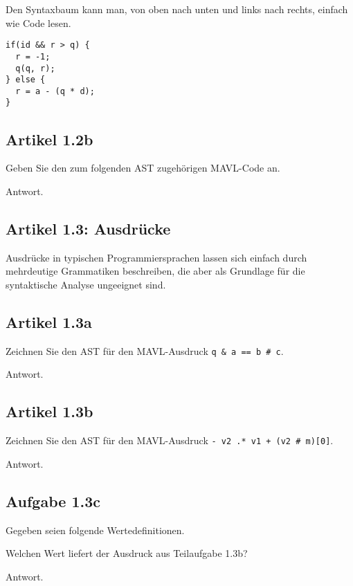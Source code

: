 \documentclass[
  ngerman,
  DIV=14
]{scrartcl}
\begin{document}
\bigskip\noindent
Den Syntaxbaum kann man, von oben nach unten und links nach rechts, einfach wie Code lesen.
\begin{lstlisting}
if(id && r > q) {
  r = -1;
  q(q, r);
} else {
  r = a - (q * d);
}
\end{lstlisting}


\subsection*{Artikel 1.2b}
Geben Sie den zum folgenden AST zugehörigen MAVL-Code an.  

\bigskip\noindent
Antwort.

\subsection*{Artikel 1.3: Ausdrücke}
Ausdrücke in typischen Programmiersprachen lassen sich einfach durch mehrdeutige Grammatiken beschreiben, die aber als Grundlage für die syntaktische Analyse ungeeignet sind.

\subsection*{Artikel 1.3a}
Zeichnen Sie den AST für den MAVL-Ausdruck \texttt{q \& a == b \# c}.


\bigskip\noindent
Antwort.

\subsection*{Artikel 1.3b}
Zeichnen Sie den AST für den MAVL-Ausdruck \texttt{- v2 .* v1 + (v2 \# m)[0]}.


\bigskip\noindent
Antwort.

\subsection*{Aufgabe 1.3c}
Gegeben seien folgende Wertedefinitionen.

Welchen Wert liefert der Ausdruck aus Teilaufgabe 1.3b?

\bigskip\noindent
Antwort.
\end{document}
